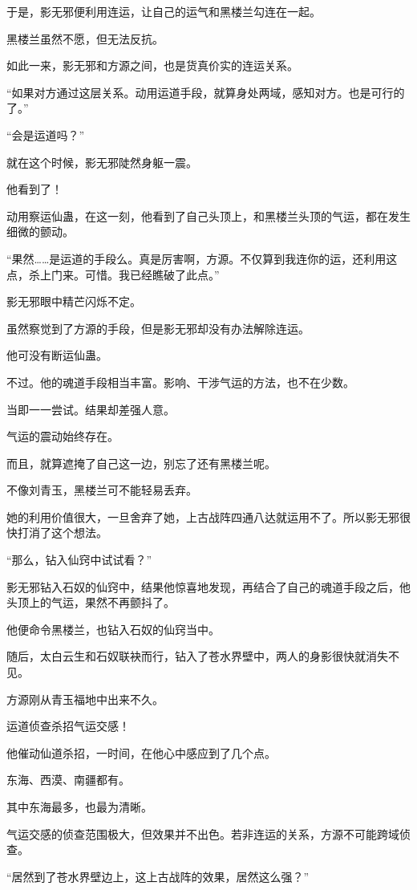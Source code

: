 \begin{this_body}
于是，影无邪便利用连运，让自己的运气和黑楼兰勾连在一起。

黑楼兰虽然不愿，但无法反抗。

如此一来，影无邪和方源之间，也是货真价实的连运关系。

“如果对方通过这层关系。动用运道手段，就算身处两域，感知对方。也是可行的了。”

“会是运道吗？”

就在这个时候，影无邪陡然身躯一震。

他看到了！

动用察运仙蛊，在这一刻，他看到了自己头顶上，和黑楼兰头顶的气运，都在发生细微的颤动。

“果然……是运道的手段么。真是厉害啊，方源。不仅算到我连你的运，还利用这点，杀上门来。可惜。我已经瞧破了此点。”

影无邪眼中精芒闪烁不定。

虽然察觉到了方源的手段，但是影无邪却没有办法解除连运。

他可没有断运仙蛊。

不过。他的魂道手段相当丰富。影响、干涉气运的方法，也不在少数。

当即一一尝试。结果却差强人意。

气运的震动始终存在。

而且，就算遮掩了自己这一边，别忘了还有黑楼兰呢。

不像刘青玉，黑楼兰可不能轻易丢弃。

她的利用价值很大，一旦舍弃了她，上古战阵四通八达就运用不了。所以影无邪很快打消了这个想法。

“那么，钻入仙窍中试试看？”

影无邪钻入石奴的仙窍中，结果他惊喜地发现，再结合了自己的魂道手段之后，他头顶上的气运，果然不再颤抖了。

他便命令黑楼兰，也钻入石奴的仙窍当中。

随后，太白云生和石奴联袂而行，钻入了苍水界壁中，两人的身影很快就消失不见。

方源刚从青玉福地中出来不久。

运道侦查杀招气运交感！

他催动仙道杀招，一时间，在他心中感应到了几个点。

东海、西漠、南疆都有。

其中东海最多，也最为清晰。

气运交感的侦查范围极大，但效果并不出色。若非连运的关系，方源不可能跨域侦查。

“居然到了苍水界壁边上，这上古战阵的效果，居然这么强？”


\end{this_body}
